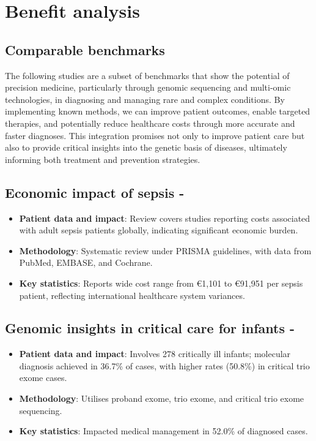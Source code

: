 \section{Benefit analysis}
\label{sec:benefit_analysis}

\subsection{Comparable benchmarks}
The following studies are a subset of benchmarks that show the potential of precision medicine, particularly through genomic sequencing and multi-omic technologies, in diagnosing and managing rare and complex conditions. 
By implementing known methods, we can improve patient outcomes, enable targeted therapies, and potentially reduce healthcare costs through more accurate and faster diagnoses.
This integration promises not only to improve patient care but also to provide critical insights into the genetic basis of diseases, ultimately informing both treatment and prevention strategies.

\subsection*{Economic impact of sepsis - \citep{van2022hospital}}
\begin{itemize}
  \item \textbf{Patient data and impact}: Review covers studies reporting costs associated with adult sepsis patients globally, indicating significant economic burden.
  \item \textbf{Methodology}: Systematic review under PRISMA guidelines, with data from PubMed, EMBASE, and Cochrane.
  \item \textbf{Key statistics}: Reports wide cost range from €1,101 to €91,951 per sepsis patient, reflecting international healthcare system variances.
\end{itemize}

\subsection*{Genomic insights in critical care for infants - \citep{meng2017use}}
\begin{itemize}
  \item \textbf{Patient data and impact}: Involves 278 critically ill infants; molecular diagnosis achieved in 36.7\% of cases, with higher rates (50.8\%) in critical trio exome cases.
  \item \textbf{Methodology}: Utilises proband exome, trio exome, and critical trio exome sequencing.
  \item \textbf{Key statistics}: Impacted medical management in 52.0\% of diagnosed cases.
\end{itemize}

